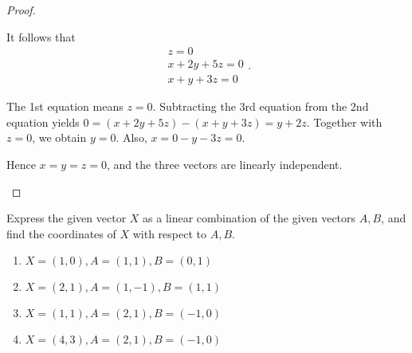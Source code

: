 \begin{proof}
\begin{enumerate}[label={(\alph*)},itemsep=0pt]
              It follows that
              \[
                  \begin{split}
                      z = 0 \\
                      x + 2y + 5z = 0 \\
                      x + y + 3z = 0
                  \end{split}.
              \]

              The 1st equation means $z = 0$. Subtracting the 3rd equation from the 2nd equation yields $0 = (x + 2y + 5z) - (x + y + 3z) = y + 2z$. Together with $z = 0$, we obtain $y = 0$. Also, $x = 0 - y - 3z = 0$.

              Hence $x = y = z = 0$, and the three vectors are linearly independent.
    \end{enumerate}
\end{proof}

\begin{exercise}
    Express the given vector $X$ as a linear combination of the given vectors $A, B$, and find the coordinates of $X$ with respect to $A, B$.
    \begin{enumerate}[label={(\alph*)},itemsep=0pt]
        \item $X = (1, 0), A = (1, 1), B = (0, 1)$
        \item $X = (2, 1), A = (1, -1), B = (1, 1)$
        \item $X = (1, 1), A = (2, 1), B = (-1, 0)$
        \item $X = (4, 3), A = (2, 1), B = (-1, 0)$
    \end{enumerate}
\end{exercise}

